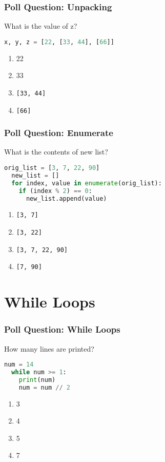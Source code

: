 \documentclass{beamer}
\begin{document}
%
%
\begin{frame}[fragile]
  \frametitle{Poll Question: Unpacking}
  What is the value of z?
  \begin{lstlisting}[language=Python, autogobble]
  x, y, z = [22, [33, 44], [66]]
  \end{lstlisting}
  \vfill
  \begin{enumerate}[A]
    \item 22
    \item 33
    \item \lstinline|[33, 44]|
    \item \lstinline|[66]|
  \end{enumerate}
\end{frame}

%
%
\begin{frame}[fragile]
  \frametitle{Poll Question: Enumerate}
  What is the contents of new list?
  \begin{lstlisting}[language=Python, autogobble]
  orig_list = [3, 7, 22, 90]
  new_list = []
  for index, value in enumerate(orig_list):
    if (index % 2) == 0:
      new_list.append(value)
  \end{lstlisting}
  \vfill
  \begin{enumerate}[A]
    \item \lstinline|[3, 7]|
    \item \lstinline|[3, 22]|
    \item \lstinline|[3, 7, 22, 90]|
    \item \lstinline|[7, 90]|
  \end{enumerate}
\end{frame}

\section{While Loops}

%
%
\begin{frame}[fragile]
  \frametitle{Poll Question: While Loops}
  How many lines are printed?
  \begin{lstlisting}[language=Python, autogobble]
  num = 14
  while num >= 1:
    print(num)
    num = num // 2
  \end{lstlisting}
  \vfill
  \begin{enumerate}[A]
    \item 3
    \item 4
    \item 5
    \item 7
  \end{enumerate}
\end{frame}
\end{document}
